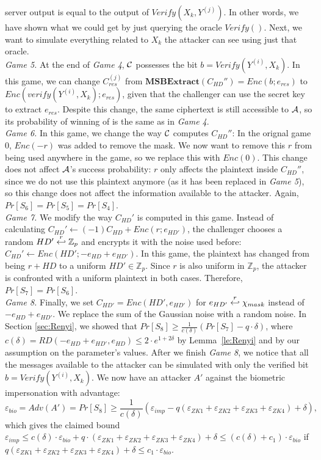 server output is equal to the output of $Verify(X_k, Y^{(j)})$. In other words,
we have shown what we could get by just querying the oracle $Verify()$. Next,
we want to simulate everything related to $X_k$ the attacker can see using
just that oracle.\\
\textit{Game 5.} At the end of \textit{Game 4}, $\mathcal{C}$ possesses the bit
$b = Verify(Y^{(i)},X_k)$. In this game, we can change $C_{res}^{(j)}$ from
$\mathbf{MSBExtract}(C_{HD}'') = Enc(b;e_{res})$ to
$Enc(verify(Y^{(i)},X_k);e_{res})$, given that the challenger can use the
secret key to extract $e_{res}$. Despite this change,  
the same ciphertext is still accessible to $\mathcal{A}$, so its probability of winning of 
is the same as in \textit{Game 4}.\\
\textit{Game 6.} In this game, we change the way $\mathcal{C}$ computes
$C_{HD}''$: In the orignal game 0, $Enc(-r)$ was added to remove the mask. We now
want to remove this $r$ from being used anywhere in the game, so we replace
this with $Enc(0)$. This change does not affect $\mathcal{A}$'s success
probability: $r$ only affects the plaintext inside $C_{HD}''$, since we do not
use this plaintext anymore (as it has been replaced in \textit{Game 5}), so this change
does not affect the information available to the attacker. Again, $Pr[S_6] = Pr[S_5] = Pr[S_4]$.\\
\textit{Game 7.} We modify the way $C_{HD}'$ is computed in this game. Instead
of calculating $C_{HD}' \gets (-1)C_{HD} + Enc(r;e_{HD'})$, the challenger chooses a
random $HD' \stackrel{r}{\hookleftarrow} \mathbb{Z}_p$ and encrypts it with the noise used
before: $C_{HD}' \gets Enc(HD'; -e_{HD} + e_{HD'})$. In this game, the
plaintext has changed from being $r + HD$ to a uniform $HD' \in \mathbb{Z}_p$.
Since $r$ is also uniform in $\mathbb{Z}_p$, the attacker is confronted with a uniform
plaintext in both cases. Therefore, $Pr[S_7] = Pr[S_6]$.\\
\textit{Game 8.} Finally, we set $C_{HD'} = Enc(HD', e_{HD'})$ for $e_{HD'}
\stackrel{r}{\hookleftarrow} \chi_{mask}$ instead of $-e_{HD} + e_{HD'}$. We replace the sum
of the Gaussian noise with a random noise. In Section \ref{sec:Renyi}, we
showed that $Pr[S_8] \geq \frac{1}{c(\delta)}(Pr[S_7]-q \cdot \delta)$, where $c(\delta) = RD(-e_{HD} + e_{HD'},
e_{HD}) \leq 2 \cdot e^{1+2\delta}$ by Lemma~\ref{le:Renyi} and by our assumption on the parameter's values. After we finish \textit{Game 8}, we notice that all the messages available to the attacker can be simulated with only the verified bit $b =
Verify(Y^{(i)}, X_k)$. We now have an attacker $A'$ against the biometric
impersonation with advantage:
\[
\varepsilon_{bio} = Adv(A') = Pr[S_8] \geq \frac{1}{c(\delta)}(\varepsilon_{imp} - q(\varepsilon_{ZK1}+\varepsilon_{ZK2} +
\varepsilon_{ZK3} + \varepsilon_{ZK4}) + \delta),
\]
which gives the claimed bound $\varepsilon_{imp} \leq c(\delta) \cdot \varepsilon_{bio} + q \cdot (\varepsilon_{ZK1}+\varepsilon_{ZK2} +
\varepsilon_{ZK3} + \varepsilon_{ZK4}) + \delta \leq (c(\delta)+c_1) \cdot \varepsilon_{bio}$ if $q(\varepsilon_{ZK1}+\varepsilon_{ZK2} +
\varepsilon_{ZK3} + \varepsilon_{ZK4}) + \delta \leq c_1 \cdot \varepsilon_{bio}$.


